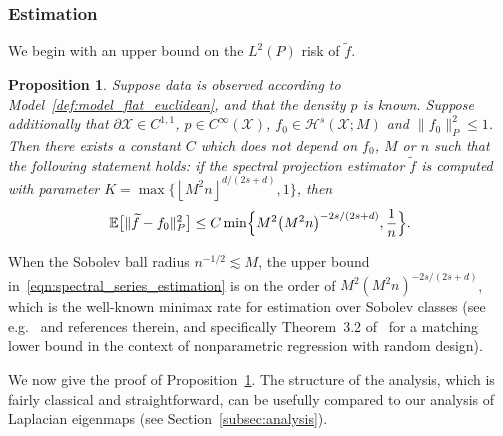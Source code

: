 \documentclass[aos]{imsart}
\theoremstyle{plain}
\newtheorem{proposition}{Proposition}
\theoremstyle{definition}
\theoremstyle{remark}
\newcommand{\Ebb}{\mathbb{E}}
\newcommand{\wt}[1]{\widetilde{#1}}
\newcommand{\mc}[1]{\mathcal{#1}}
\newcommand{\floor}[1]{\left\lfloor #1 \right\rfloor}
\newcommand{\1}{\mathbf{1}}
\begin{document}
\subsubsection{Estimation}
We begin with an upper bound on the $L^2(P)$ risk of $\wt{f}$.
\begin{proposition}
	\label{prop:spectral_series_estimation}
	Suppose data is observed according to Model~\ref{def:model_flat_euclidean}, and that the density $p$ is known.  Suppose additionally that $\partial \mc{X} \in C^{1,1}$, $p \in C^{\infty}(\mc{X})$, $f_0 \in \mc{H}^{s}(\mc{X};M)$ and $\|f_0\|_P^2 \leq 1$. Then there exists a constant $C$ which does not depend on $f_0$, $M$ or $n$ such that the following statement holds: if the spectral projection estimator $\wt{f}$ is computed with parameter $K = \max\{\floor{M^2n}^{d/(2s + d)},1\}$, then
	\begin{equation}
	\label{eqn:spectral_series_estimation}
	\Ebb\bigl[\|\wt{f} - f_0\|_P^2\bigr] \leq C \min\Bigl\{M^2\bigl(M^2n\bigr)^{-2s/(2s + d)}, \frac{1}{n}\Bigr\}.
	\end{equation}
\end{proposition}
When the Sobolev ball radius $n^{-1/2} \lesssim M$, the upper bound in~\eqref{eqn:spectral_series_estimation} is on the order of $M^2(M^2n)^{-2s/(2s + d)}$, which is the well-known minimax rate for estimation over Sobolev classes (see e.g.~\cite{gyorfi2006,wasserman2006,tsybakov08} and references therein, and specifically Theorem~3.2 of~\cite{gyorfi2006} for a matching lower bound in the context of nonparametric regression with random design). 


We now give the proof of Proposition~\ref{prop:spectral_series_estimation}. The structure of the analysis, which is fairly classical and straightforward, can be usefully compared to our analysis of Laplacian eigenmaps (see Section~\ref{subsec:analysis}).
\end{document}
